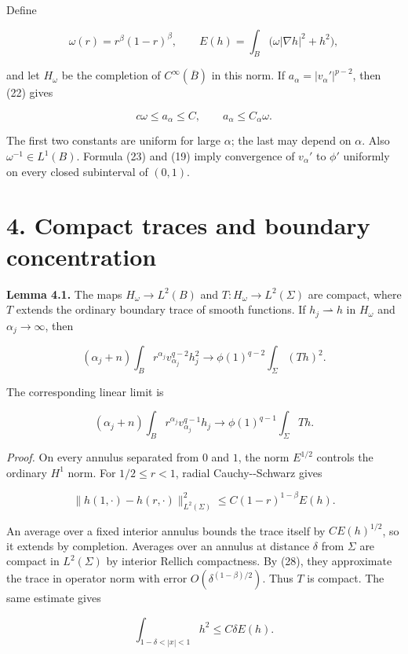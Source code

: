 \documentclass[11pt]{article}
\begin{document}
Define

\[
\omega(r)=r^\beta(1-r)^\beta,\qquad
E(h)=\int_B\bigl(\omega|\nabla h|^2+h^2\bigr),
\tag{24}
\]

and let \(H_\omega\) be the completion of \(C^\infty(\overline B)\) in
this norm. If \(a_\alpha=|v_\alpha'|^{p-2}\), then (22) gives

\[
c\omega\le a_\alpha\le C,\qquad a_\alpha\le C_\alpha\omega.
\tag{25}
\]

The first two constants are uniform for large \(\alpha\); the last may
depend on \(\alpha\). Also \(\omega^{-1}\in L^1(B)\). Formula (23) and
(19) imply convergence of \(v_\alpha'\) to \(\phi'\) uniformly on every
closed subinterval of \((0,1)\).

\section{4. Compact traces and boundary
concentration}\label{compact-traces-and-boundary-concentration}

\textbf{Lemma 4.1.} The maps \(H_\omega\to L^2(B)\) and
\(T:H_\omega\to L^2(\Sigma)\) are compact, where \(T\) extends the
ordinary boundary trace of smooth functions. If \(h_j\rightharpoonup h\)
in \(H_\omega\) and \(\alpha_j\to\infty\), then

\[
(\alpha_j+n)\int_B r^{\alpha_j}v_{\alpha_j}^{q-2}h_j^2
\longrightarrow\phi(1)^{q-2}\int_\Sigma(Th)^2.
\tag{26}
\]

The corresponding linear limit is

\[
(\alpha_j+n)\int_B r^{\alpha_j}v_{\alpha_j}^{q-1}h_j
\longrightarrow\phi(1)^{q-1}\int_\Sigma Th.
\tag{27}
\]

\emph{Proof.} On every annulus separated from \(0\) and \(1\), the norm
\(E^{1/2}\) controls the ordinary \(H^1\) norm. For \(1/2\le r<1\),
radial Cauchy-\/-Schwarz gives

\[
\|h(1,\cdot)-h(r,\cdot)\|_{L^2(\Sigma)}^2
\le C(1-r)^{1-\beta}E(h).
\tag{28}
\]

An average over a fixed interior annulus bounds the trace itself by
\(CE(h)^{1/2}\), so it extends by completion. Averages over an annulus
at distance \(\delta\) from \(\Sigma\) are compact in \(L^2(\Sigma)\) by
interior Rellich compactness. By (28), they approximate the trace in
operator norm with error \(O(\delta^{(1-\beta)/2})\). Thus \(T\) is
compact. The same estimate gives

\[
\int_{1-\delta<|x|<1}h^2\le C\delta E(h).
\tag{29}
\]
\end{document}
